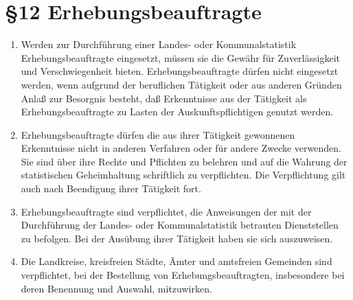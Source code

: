     \section{\S12 Erhebungsbeauftragte}
        \begin{enumerate}[label=(\arabic*)]
            \item Werden zur Durchführung einer Landes- oder Kommunalstatistik Erhebungsbeauftragte eingesetzt, müssen sie die Gewähr für Zuverlässigkeit und Verschwiegenheit bieten. Erhebungsbeauftragte dürfen nicht eingesetzt werden, wenn aufgrund der beruflichen Tätigkeit oder aus anderen Gründen Anlaß zur Besorgnis besteht, daß Erkenntnisse aus der Tätigkeit als Erhebungsbeauftragte zu Lasten der Auskunftspflichtigen genutzt werden.
            \item Erhebungsbeauftragte dürfen die aus ihrer Tätigkeit gewonnenen Erkenntnisse nicht in anderen Verfahren oder für andere Zwecke verwenden. Sie sind über ihre Rechte und Pflichten zu belehren und auf die Wahrung der statistischen Geheimhaltung schriftlich zu verpflichten. Die Verpflichtung gilt auch nach Beendigung ihrer Tätigkeit fort.
            \item Erhebungsbeauftragte sind verpflichtet, die Anweisungen der mit der Durchführung der Landes- oder Kommunalstatistik betrauten Dienststellen zu befolgen. Bei der Ausübung ihrer Tätigkeit haben sie sich auszuweisen.
            \item Die Landkreise, kreisfreien Städte, Ämter und amtsfreien Gemeinden sind verpflichtet, bei der Bestellung von Erhebungsbeauftragten, insbesondere bei deren Benennung und Auswahl, mitzuwirken.
        \end{enumerate}
 
